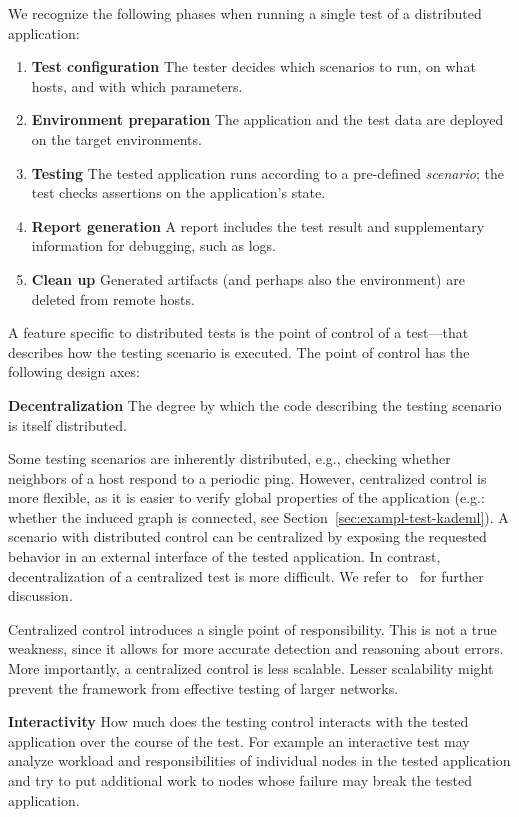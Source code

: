 We recognize the following phases when running a single test of a distributed
application:

\begin{enumerate}
\item \textbf{Test configuration} The tester decides which scenarios to run, on what
  hosts, and with which parameters.
\item \textbf{Environment preparation} The application and the test data are deployed on the target environments.
\item \textbf{Testing} The tested application runs according to a pre-defined \emph{scenario}; the test checks assertions on the application's state.
\item \textbf{Report generation} A report includes the test
  result and supplementary information for debugging, such as logs.
\item \textbf{Clean up} Generated artifacts (and perhaps also the environment) are deleted from remote hosts.
\end{enumerate}

A feature specific to distributed tests is the point of control of a test---that
describes how the testing scenario is executed. The point of control has the
following design axes:

\begin{description}
  \item{\textbf{Decentralization}} The degree by which the code describing the testing scenario is itself distributed.

    Some testing scenarios are inherently distributed, e.g., checking whether
    neighbors of a host respond to a periodic ping.  However, centralized
    control is more flexible, as it is easier to verify global properties of the
    application (e.g.: whether the induced graph is connected, see
    Section~\ref{sec:exampl-test-kademl}).  A scenario with distributed control
    can be centralized by exposing the requested behavior in an external
    interface of the tested application. In contrast, decentralization of a centralized
    test is more difficult.
    We refer to~\cite{ulr99,hie08,hie12} for further discussion.

    Centralized control introduces a single point of responsibility.
    This is not a true weakness, since it allows for more accurate detection and reasoning about errors.
    More importantly, a centralized control is less scalable.
    Lesser scalability might prevent the framework from effective testing of larger networks.

  \item{\textbf{Interactivity}} How much does the testing control interacts with
    the tested application over the course of the test.
    For example an interactive test may analyze workload and responsibilities of
    individual nodes in the tested application and try to put additional work to
    nodes whose failure may break the tested application.
\end{description}


